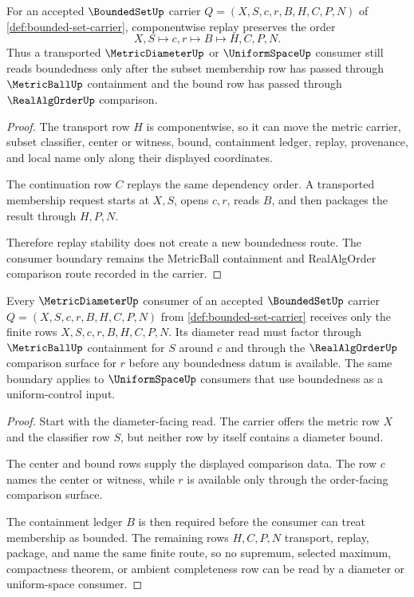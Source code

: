 \begin{theorem}
\label{thm:bounded-set-subset-ball-replay-stability}
For an accepted $\BoundedSetUp$ carrier $Q=(X,S,c,r,B,H,C,P,N)$ of \autoref{def:bounded-set-carrier}, componentwise replay preserves the order
$$
X,S \longmapsto c,r \longmapsto B \longmapsto H,C,P,N .
$$
Thus a transported $\MetricDiameterUp$ or $\UniformSpaceUp$ consumer still reads boundedness only after the subset membership row has passed through $\MetricBallUp$ containment and the bound row has passed through $\RealAlgOrderUp$ comparison.
\end{theorem}
\begin{proof}
The transport row $H$ is componentwise, so it can move the metric carrier, subset classifier, center or witness, bound, containment ledger, replay, provenance, and local name only along their displayed coordinates.

The continuation row $C$ replays the same dependency order. A transported membership request starts at $X,S$, opens $c,r$, reads $B$, and then packages the result through $H,P,N$.

Therefore replay stability does not create a new boundedness route. The consumer boundary remains the MetricBall containment and RealAlgOrder comparison route recorded in the carrier.
\end{proof}

\begin{theorem}
\label{thm:bounded-set-diameter-consumer-boundary}
Every $\MetricDiameterUp$ consumer of an accepted $\BoundedSetUp$ carrier $Q=(X,S,c,r,B,H,C,P,N)$ from \autoref{def:bounded-set-carrier} receives only the finite rows $X,S,c,r,B,H,C,P,N$. Its diameter read must factor through $\MetricBallUp$ containment for $S$ around $c$ and through the $\RealAlgOrderUp$ comparison surface for $r$ before any boundedness datum is available. The same boundary applies to $\UniformSpaceUp$ consumers that use boundedness as a uniform-control input.
\end{theorem}
\begin{proof}
Start with the diameter-facing read. The carrier offers the metric row $X$ and the classifier row $S$, but neither row by itself contains a diameter bound.

The center and bound rows supply the displayed comparison data. The row $c$ names the center or witness, while $r$ is available only through the order-facing comparison surface.

The containment ledger $B$ is then required before the consumer can treat membership as bounded. The remaining rows $H,C,P,N$ transport, replay, package, and name the same finite route, so no supremum, selected maximum, compactness theorem, or ambient completeness row can be read by a diameter or uniform-space consumer.
\end{proof}

